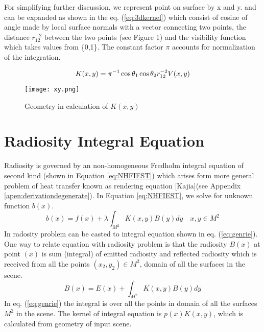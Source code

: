 For simplifying further discussion, we represent point on surface by x and y. and can be expanded as shown in the eq. (\ref{eq:3dkernel}) which consist of cosine of angle made by local surface normals with a vector connecting two points, the distance  $r_{12}^{-2}$ between the two points (see Figure 1) and the visibility function which takes values from \{0,1\}. The constant factor $\pi$ accounts for normalization of the integration. 

\begin{equation} \label{eq:3dkernel}
K(x,y) = \pi^{-1} \cos \theta_1 \cos \theta_2 r_{12}^{-2} V(x,y) \\ 
\end{equation}


\begin{figure}[h]
\centering
\texttt{[image: xy.png]}
\caption{Geometry in calculation of $K(x,y)$}
\label{fig:xytheta}
\end{figure}

\section {Radiosity Integral Equation}
Radiosity is governed by an non-homogeneous Fredholm integral equation of second kind (shown in Equation \ref{eq:NHFIEST}) which arises form more general problem of heat transfer known as rendering equation [Kajia](see Appendix \ref{apen:derivationdegenerate}). In Equation \ref{eq:NHFIEST}, we solve for unknown function $b(x)$. 
\begin{equation} \label{eq:NHFIEST}
b(x)=f(x)+\lambda\int_{M^2} K(x,y)B(y)dy\quad x,y \in M^2
\end{equation}
In radosity problem can be casted to integral equation shown in eq. (\ref{eq:genrie}). One way to relate equation with radiosity problem is that the radiosity $B(x)$ at point $(x)$  is sum (integral) of emitted radiosity and reflected radiosity which is received from all the points $(x_2,y_2) \in M^2$,  domain of all the surfaces in the scene.\\

\begin{equation} \label{eq:genrie}
B(x)=E(x)+\int_{M^2}K(x,y)B(y)dy
\end{equation}
In eq. (\ref{eq:genrie}) the integral is over all the points in domain of all  the surfaces $M^2$ in the scene. The kernel of integral equation is $p(x)K(x,y)$, which is calculated from geometry of input scene. 


